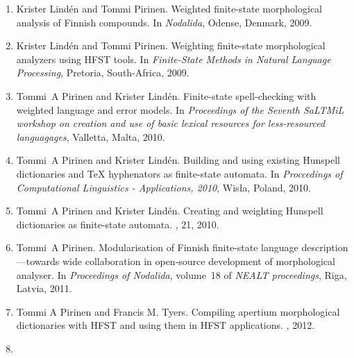 \documentclass[officiallayout]{unihelcompling}
\begin{document}
\begin{enumerate}
    \item[\citetalias{pirinen2009weighted}]
        Krister Lindén and Tommi Pirinen.
        \newblock Weighted finite-state morphological analysis of Finnish 
        compounds.
        \newblock In \emph{Nodalida}, Odense, Denmark, 2009.
    \item[\citetalias{pirinen2009weighting}]
        Krister Lindén and Tommi Pirinen.
        \newblock Weighting finite-state morphological analyzers using HFST
        tools.
        \newblock In \emph{Finite-State Methods in Natural Language Processing},
        Pretoria, South-Africa, 2009.
    \item[\citetalias{pirinen2010finitestate}]
        Tommi~A Pirinen and Krister Lindén.
        \newblock Finite-state spell-checking with weighted language and error
        models.
        \newblock In {\em Proceedings of the Seventh SaLTMiL workshop on 
            creation and use of basic lexical resources for less-resourced 
        languagages}, Valletta, Malta, 2010.
    \item[\citetalias{pirinen2010building}]
        Tommi~A Pirinen and Krister Lindén.
        \newblock Building and using existing Hunspell dictionaries and {\TeX }
        hyphenators as finite-state automata.
        \newblock In {\em Proccedings of Computational Linguistics -
            Applications, 2010}, Wis{\l}a, Poland, 2010.
    \item[\citetalias{pirinen2010creating}]
        Tommi~A Pirinen and Krister Lindén.
        \newblock Creating and weighting Hunspell dictionaries as finite-state
        automata.
        , 21, 2010.
    \item[\citetalias{pirinen2011modularisation}]
        Tommi~A Pirinen.
        \newblock Modularisation of Finnish finite-state language 
        description—towards wide collaboration in open-source development of
        morphological analyser.
        \newblock In {\em Proceedings of Nodalida}, volume~18 of {\em NEALT
        proceedings}, Rīga, Latvia, 2011.
    \item[\citetalias{pirinen2012compiling}]
        Tommi A Pirinen and Francis M. Tyers.
        \newblock Compiling apertium morphological dictionaries with HFST and
        using them in HFST applications.
        , 2012.
    \item[\citetalias{pirinen2012improving}]

\end{enumerate}
\end{document}
